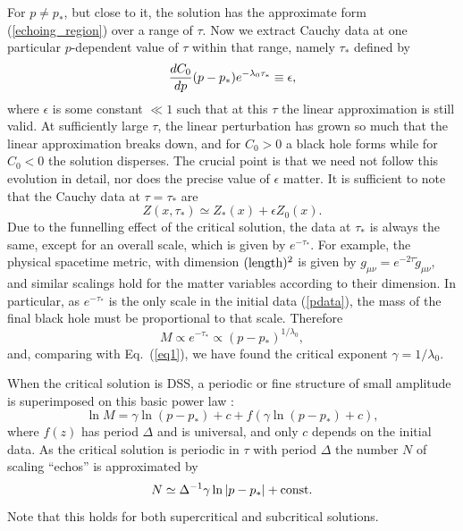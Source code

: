 \documentclass{article}
\begin{document}
For $p\ne p_*$, but close to it, the solution has the approximate form
(\ref{echoing_region}) over a range of $\tau$. Now we extract Cauchy
data at one particular $p$-dependent value of $\tau$ within that
range, namely $\tau_*$ defined by
%
\label{taustardef}
\begin{equation}
  {dC_0\over dp} (p-p_*) e^{-\lambda_0\tau_*} \equiv \epsilon,
\end{equation}
%
where $\epsilon$ is some constant $\ll 1$ such that at this $\tau$ the
linear approximation is still valid. At sufficiently large $\tau$, the
linear perturbation has grown so much that the linear approximation
breaks down, and for $C_0>0$ a black hole forms while for $C_0<0$ the
solution disperses. The crucial point is that we need not follow this
evolution in detail, nor does the precise value of $\epsilon$
matter. It is sufficient to note that the Cauchy data at $\tau=\tau_*$
are
%
\begin{equation}
\label{pdata}
  Z(x,\tau_*) \simeq Z_*(x) + \epsilon Z_0(x).
\end{equation}
%
Due to the funnelling effect
of the critical solution, the data
at $\tau_*$ is always the same, except for an overall scale, which is given
by $e^{-\tau_*}$. For example, the physical spacetime metric, with
dimension $(\hbox{length})^2$ is given by $g_{\mu\nu}=e^{-2\tau}
\tilde g_{\mu\nu}$, and similar scalings hold for the matter variables
according to their dimension.  In particular, as $e^{-\tau_*}$ is the
only scale in the initial data (\ref{pdata}), the mass of the final
black hole must be proportional to that scale. Therefore
%
\begin{equation}
\label{massscaling}
  M \propto e^{-\tau_*} \propto (p-p_*)^{1 / \lambda_0},
\end{equation}
%
and, comparing with Eq.~(\ref{eq1}), we have found the critical exponent
$\gamma = 1/\lambda_0$.

When the critical solution is DSS, a periodic or fine structure of
small amplitude is superimposed on this basic power law
\cite{Gundlach_Chop2, HodPiran_wiggle}:
%
\begin{equation}
  \ln M = \gamma \ln (p-p_*) + c + f\left(\gamma \ln (p-p_*) + c\right),
\end{equation}
%
where $f(z)$ has period $\Delta$ and is universal, and only $c$
depends on the initial data. As the critical solution is periodic in $\tau$
with period $\Delta$ the number $N$ of scaling ``echos'' is
approximated by
%
\begin{equation}
  N \simeq \Delta^{-1} \gamma \ln|p-p_*| + {\rm const.}
\end{equation}
%
Note that this holds for both supercritical and subcritical solutions.
\end{document}
